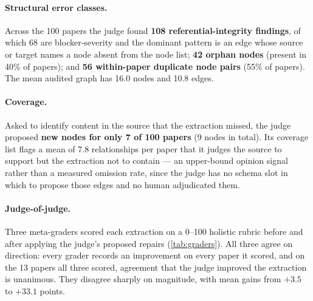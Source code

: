 \documentclass[10pt,twocolumn,letterpaper]{article}
\begin{document}
\paragraph{Structural error classes.} Across the 100 papers the judge found
\textbf{108 referential-integrity findings}, of which 68 are blocker-severity and
the dominant pattern is an edge whose source or target names a node absent from
the node list; \textbf{42 orphan nodes} (present in 40\% of papers); and
\textbf{56 within-paper duplicate node pairs} (55\% of papers). The mean audited
graph has 16.0 nodes and 10.8 edges.

\paragraph{Coverage.} Asked to identify content in the source that the extraction
missed, the judge proposed \textbf{new nodes for only 7 of 100 papers} (9 nodes
in total). Its coverage list flags a mean of 7.8 relationships per paper that it
judges the source to support but the extraction not to contain --- an upper-bound
opinion signal rather than a measured omission rate, since the judge has no
schema slot in which to propose those edges and no human adjudicated them.

\paragraph{Judge-of-judge.} Three meta-graders scored each extraction on a 0--100
holistic rubric before and after applying the judge's proposed repairs
(\cref{tab:graders}). All three agree on direction: every grader records an
improvement on every paper it scored, and on the 13 papers all three scored,
agreement that the judge improved the extraction is unanimous. They disagree
sharply on magnitude, with mean gains from $+3.5$ to $+33.1$ points.
\end{document}
